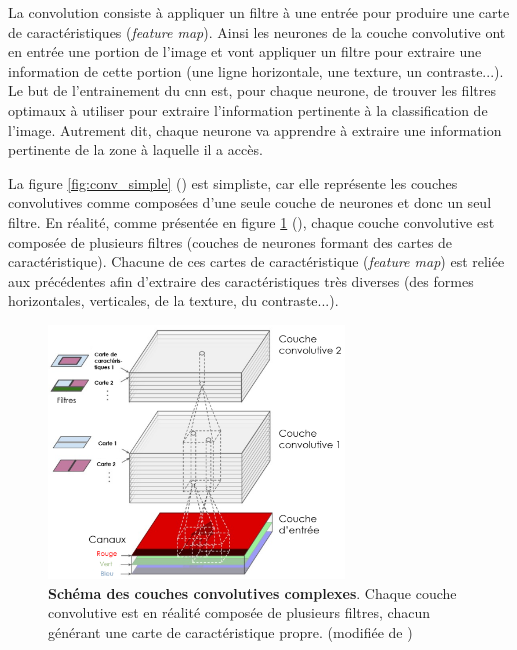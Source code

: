 La convolution consiste à appliquer un filtre à une entrée pour produire une carte de caractéristiques (\textit{feature map}). Ainsi les neurones de la couche convolutive ont en entrée une portion de l'image et vont appliquer un filtre pour extraire une information de cette portion (une ligne horizontale, une texture, un contraste...). Le but de l'entrainement du \gls{cnn} est, pour chaque neurone, de trouver les filtres optimaux à utiliser pour extraire l'information pertinente à la classification de l'image. Autrement dit, chaque neurone va apprendre à extraire une information pertinente de la zone à laquelle il a accès.


La figure \ref{fig:conv_simple} (\cite{aurelien_geron_hands-machine_2019}) est simpliste, car elle représente les couches convolutives comme composées d'une seule couche de neurones et donc un seul filtre. En réalité, comme présentée en figure \ref{fig:conv_complex} (\cite{aurelien_geron_hands-machine_2019}), chaque couche convolutive est composée de plusieurs filtres (couches de neurones formant des cartes de caractéristique). Chacune de ces cartes de caractéristique (\textit{feature map}) est reliée aux précédentes afin d'extraire des caractéristiques très diverses (des formes horizontales, verticales, de la texture, du contraste...).
\begin{figure}[!ht]
 \centering
 \includegraphics[width=0.7\textwidth]{figures/conv_complex.png}
 \caption[Schéma des couches convolutives]{\textbf{Schéma des couches convolutives complexes}. Chaque couche convolutive est en réalité composée de plusieurs filtres, chacun générant une carte de caractéristique propre. (modifiée de \cite{aurelien_geron_hands-machine_2019})}
 \label{fig:conv_complex}
\end{figure}


